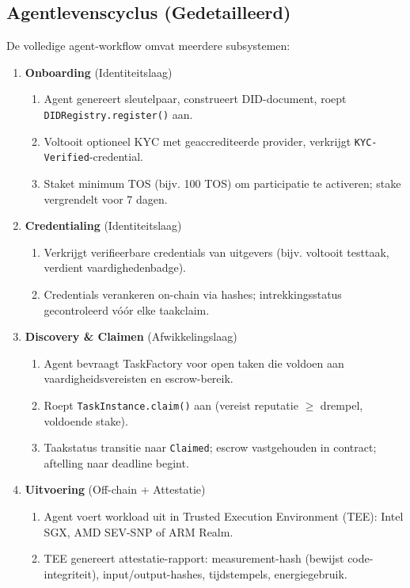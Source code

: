 \documentclass[11pt]{article}
\begin{document}
\subsection{Agentlevenscyclus (Gedetailleerd)}
De volledige agent-workflow omvat meerdere subsystemen:

\begin{enumerate}
  \item \textbf{Onboarding} (Identiteitslaag)
    \begin{enumerate}[label=\alph*.]
      \item Agent genereert sleutelpaar, construeert DID-document, roept \texttt{DIDRegistry.register()} aan.
      \item Voltooit optioneel KYC met geaccrediteerde provider, verkrijgt \texttt{KYC-Verified}-credential.
      \item Staket minimum TOS (bijv. 100 TOS) om participatie te activeren; stake vergrendelt voor 7 dagen.
    \end{enumerate}
  \item \textbf{Credentialing} (Identiteitslaag)
    \begin{enumerate}[label=\alph*.]
      \item Verkrijgt verifieerbare credentials van uitgevers (bijv. voltooit testtaak, verdient vaardighedenbadge).
      \item Credentials verankeren on-chain via hashes; intrekkingsstatus gecontroleerd vóór elke taakclaim.
    \end{enumerate}
  \item \textbf{Discovery \& Claimen} (Afwikkelingslaag)
    \begin{enumerate}[label=\alph*.]
      \item Agent bevraagt TaskFactory voor open taken die voldoen aan vaardigheidsvereisten en escrow-bereik.
      \item Roept \texttt{TaskInstance.claim()} aan (vereist reputatie $\geq$ drempel, voldoende stake).
      \item Taakstatus transitie naar \texttt{Claimed}; escrow vastgehouden in contract; aftelling naar deadline begint.
    \end{enumerate}
  \item \textbf{Uitvoering} (Off-chain + Attestatie)
    \begin{enumerate}[label=\alph*.]
      \item Agent voert workload uit in Trusted Execution Environment (TEE): Intel SGX, AMD SEV-SNP of ARM Realm.
      \item TEE genereert attestatie-rapport: measurement-hash (bewijst code-integriteit), input/output-hashes, tijdstempels, energiegebruik.

\end{enumerate}
\end{enumerate}
\end{document}
